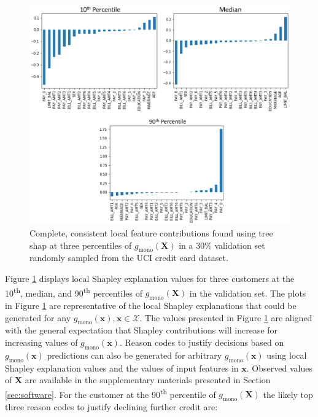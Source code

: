 \documentclass[11pt]{asaproc}
\begin{document}
\begin{figure}[htb]
	\begin{center}
		\includegraphics[scale=0.6]{img/figure_10.eps}
		\caption{Complete, consistent local feature contributions found using tree shap at three percentiles of $g_{\text{mono}}(\mathbf{X})$ in a 30\% validation set randomly sampled from the UCI credit card dataset.}
		\label{fig:cc_shap}
	\end{center}
\end{figure}

Figure \ref{fig:cc_shap} displays local Shapley explanation values for three customers at the 10\textsuperscript{th}, median, and 90\textsuperscript{th} percentiles of $g_{\text{mono}}(\mathbf{X})$ in the validation set. The plots in Figure \ref{fig:cc_shap} are representative of the local Shapley explanations that could be generated for any $g_{\text{mono}}(\mathbf{x}), \mathbf{x} \in \mathcal{X}$. The values presented in Figure \ref{fig:cc_shap} are aligned with the general expectation that Shapley contributions will increase for increasing values of $g_{\text{mono}}(\mathbf{x})$. Reason codes to justify decisions based on $g_{\text{mono}}(\mathbf{x})$ predictions can also be generated for arbitrary $g_{\text{mono}}(\mathbf{x})$ using local Shapley explanation values and the values of input features in $\mathbf{x}$. 
Observed values of $\mathbf{X}$ are available in the supplementary materials presented in Section \ref{sec:software}. For the customer at the 90\textsuperscript{th} percentile of $g_{\text{mono}}(\mathbf{X})$ the likely top three reason codes to justify declining further credit are:
\end{document}
